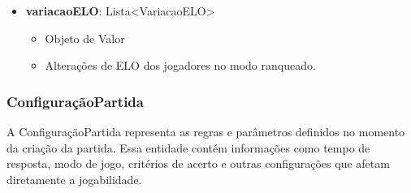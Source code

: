 \begin{itemize}
        \item \textbf{variacaoELO}: Lista\textless VariacaoELO\textgreater  
              \begin{itemize}
                  \item Objeto de Valor
                  \item Alterações de ELO dos jogadores no modo ranqueado.
              \end{itemize}
    \end{itemize}

    \subsubsection{ConfiguraçãoPartida}
    A ConfiguraçãoPartida representa as regras e parâmetros definidos no momento da criação da partida. Essa entidade contém informações como tempo de resposta, modo de jogo, critérios de acerto e outras configurações que afetam diretamente a jogabilidade.
